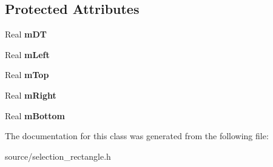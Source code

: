 \subsection*{Protected Attributes}
\begin{DoxyCompactItemize}
\item 
\mbox{\label{class_selection_rectangle_aa0bfbf2bbfc4ba777b3c3eccd974ff8f}} 
Real {\bfseries m\+DT}
\item 
\mbox{\label{class_selection_rectangle_ae9157a6a2071741f54e8695312ccb077}} 
Real {\bfseries m\+Left}
\item 
\mbox{\label{class_selection_rectangle_abba44124a6f1c8c1ac6df9dc5fcd9b51}} 
Real {\bfseries m\+Top}
\item 
\mbox{\label{class_selection_rectangle_aaeef8ec60391a7083def8eff75067c58}} 
Real {\bfseries m\+Right}
\item 
\mbox{\label{class_selection_rectangle_a20df8a5f67ad725b8537c0a7ea9cc458}} 
Real {\bfseries m\+Bottom}
\end{DoxyCompactItemize}


The documentation for this class was generated from the following file\+:\begin{DoxyCompactItemize}
\item 
source/selection\+\_\+rectangle.\+h\end{DoxyCompactItemize}
